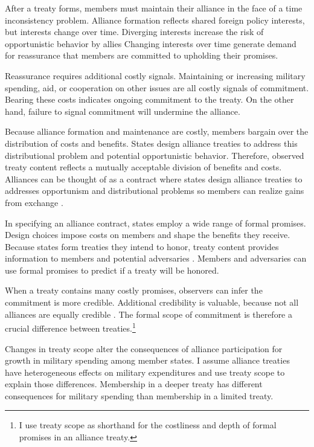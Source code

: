 \documentclass[12pt]{article}
\begin{document}
After a treaty forms, members must maintain their alliance in the face of a time inconsistency problem. 
Alliance formation reflects shared foreign policy interests, but interests change over time. 
Diverging interests increase the risk of opportunistic behavior by allies \citep{Leeds2003a, LeedsSavun2007}
Changing interests over time generate demand for reassurance that members are committed to upholding their promises. 


Reassurance requires additional costly signals. 
Maintaining or increasing military spending, aid, or cooperation on other issues are all costly signals of commitment. 
Bearing these costs indicates ongoing commitment to the treaty. 
On the other hand, failure to signal commitment will undermine the alliance. 


Because alliance formation and maintenance are costly, members bargain over the distribution of costs and benefits.
States design alliance treaties to address this distributional problem and potential opportunistic behavior. 
Therefore, observed treaty content reflects a mutually acceptable division of benefits and costs. 
Alliances can be thought of as a contract where states design alliance treaties to addresses opportunism and distributional problems \citep{Williamson1985, Koremenosetal2001} so members can realize gains from exchange \citep{Lake1996, Bensonetal2014}.


In specifying an alliance contract, states employ a wide range of formal promises. 
Design choices impose costs on members and shape the benefits they receive.
Because states form treaties they intend to honor, treaty content provides information to members and potential adversaries \citep{Leeds2003}. 
Members and adversaries can use formal promises to predict if a treaty will be honored.


When a treaty contains many costly promises, observers can infer the commitment is more credible. 
Additional credibility is valuable, because not all alliances are equally credible \citep{Benson2012}. 
The formal scope of commitment is therefore a crucial difference between treaties.\footnote{I use treaty scope as shorthand for the costliness and depth of formal promises in an alliance treaty.} 


Changes in treaty scope alter the consequences of alliance participation for growth in military spending among member states. 
I assume alliance treaties have heterogeneous effects on military expenditures and use treaty scope to explain those differences. 
Membership in a deeper treaty has different consequences for military spending than membership in a limited treaty. 
\end{document}
